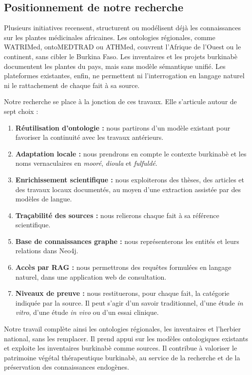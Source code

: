 \subsection{Positionnement de notre recherche}
\label{subsec:positionnement}
\label{subsubsec:apports_travail}

Plusieurs initiatives recensent, structurent ou modélisent déjà les connaissances sur les plantes médicinales africaines. Les ontologies régionales, comme WATRIMed, ontoMEDTRAD ou ATHMed, couvrent l'Afrique de l'Ouest ou le continent, sans cibler le Burkina Faso. Les inventaires et les projets burkinabè documentent les plantes du pays, mais sans modèle sémantique unifié. Les plateformes existantes, enfin, ne permettent ni l'interrogation en langage naturel ni le rattachement de chaque fait à sa source.

Notre recherche se place à la jonction de ces travaux. Elle s'articule autour de sept choix :
\begin{enumerate}[label=\arabic*., leftmargin=1cm]
    \item \textbf{Réutilisation d'ontologie :} nous partirons d'un modèle existant pour favoriser la continuité avec les travaux antérieurs.
    \item \textbf{Adaptation locale :} nous prendrons en compte le contexte burkinabè et les noms vernaculaires en \textit{mooré}, \textit{dioula} et \textit{fulfuldé}.
    \item \textbf{Enrichissement scientifique :} nous exploiterons des thèses, des articles et des travaux locaux documentés, au moyen d'une extraction assistée par des modèles de langue.
    \item \textbf{Traçabilité des sources :} nous relierons chaque fait à sa référence scientifique.
    \item \textbf{Base de connaissances graphe :} nous représenterons les entités et leurs relations dans Neo4j.
    \item \textbf{Accès par RAG :} nous permettrons des requêtes formulées en langage naturel, dans une application web de consultation.
    \item \textbf{Niveaux de preuve :} nous restituerons, pour chaque fait, la catégorie indiquée par la source. Il peut s'agir d'un savoir traditionnel, d'une étude \textit{in vitro}, d'une étude \textit{in vivo} ou d'un essai clinique.
\end{enumerate}

Notre travail complète ainsi les ontologies régionales, les inventaires et l'herbier national, sans les remplacer. Il prend appui sur les modèles ontologiques existants et exploite les inventaires burkinabè comme sources. Il contribue à valoriser le patrimoine végétal thérapeutique burkinabè, au service de la recherche et de la préservation des connaissances endogènes.

